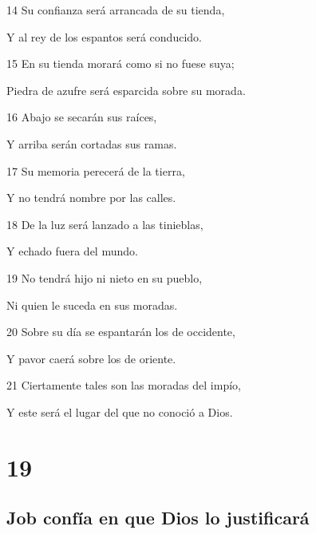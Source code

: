 \par 14 Su confianza será arrancada de su tienda,
\par Y al rey de los espantos será conducido.
\par 15 En su tienda morará como si no fuese suya;
\par Piedra de azufre será esparcida sobre su morada.
\par 16 Abajo se secarán sus raíces,
\par Y arriba serán cortadas sus ramas.
\par 17 Su memoria perecerá de la tierra,
\par Y no tendrá nombre por las calles.
\par 18 De la luz será lanzado a las tinieblas,
\par Y echado fuera del mundo.
\par 19 No tendrá hijo ni nieto en su pueblo,
\par Ni quien le suceda en sus moradas.
\par 20 Sobre su día se espantarán los de occidente,
\par Y pavor caerá sobre los de oriente.
\par 21 Ciertamente tales son las moradas del impío,
\par Y este será el lugar del que no conoció a Dios.

\chapter{19}

\section*{Job confía en que Dios lo justificará}

